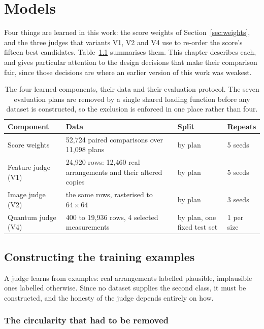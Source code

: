 \chapter{Models}
\label{ch:models}

Four things are learned in this work: the score weights of
Section~\ref{sec:weights}, and the three judges that variants V1, V2 and
V4 use to re-order the score's fifteen best candidates.
Table~\ref{tab:models} summarises them. This chapter describes each, and
gives particular attention to the design decisions that make their
comparison fair, since those decisions are where an earlier version of
this work was weakest.

\begin{table}[H]
\centering
\caption[The four learned components]{The four learned components, their
data and their evaluation protocol. The seven evaluation plans are removed
by a single shared loading function before any dataset is constructed, so
the exclusion is enforced in one place rather than four.}
\label{tab:models}
\small
\begin{tabularx}{\textwidth}{lXll}
\toprule
Component & Data & Split & Repeats \\
\midrule
Score weights & 52,724 paired comparisons over 11,098 plans & by plan & 5 seeds \\
Feature judge (V1) & 24,920 rows: 12,460 real arrangements and their altered copies & by plan & 5 seeds \\
Image judge (V2) & the same rows, rasterised to $64\times64$ & by plan & 3 seeds \\
Quantum judge (V4) & 400 to 19,936 rows, 4 selected measurements & by plan, one fixed test set & 1 per size \\
\bottomrule
\end{tabularx}
\end{table}

\section{Constructing the training examples}
\label{sec:negatives}

A judge learns from examples: real arrangements labelled plausible,
implausible ones labelled otherwise. Since no dataset supplies the second
class, it must be constructed, and the honesty of the judge depends
entirely on how.

\subsection{The circularity that had to be removed}

